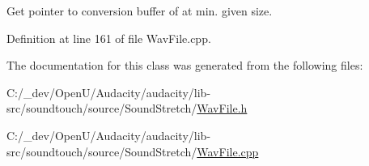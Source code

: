 Get pointer to conversion buffer of at min. given size. 



Definition at line 161 of file Wav\+File.\+cpp.



The documentation for this class was generated from the following files\+:\begin{DoxyCompactItemize}
\item 
C\+:/\+\_\+dev/\+Open\+U/\+Audacity/audacity/lib-\/src/soundtouch/source/\+Sound\+Stretch/\hyperlink{_wav_file_8h}{Wav\+File.\+h}\item 
C\+:/\+\_\+dev/\+Open\+U/\+Audacity/audacity/lib-\/src/soundtouch/source/\+Sound\+Stretch/\hyperlink{_wav_file_8cpp}{Wav\+File.\+cpp}\end{DoxyCompactItemize}
